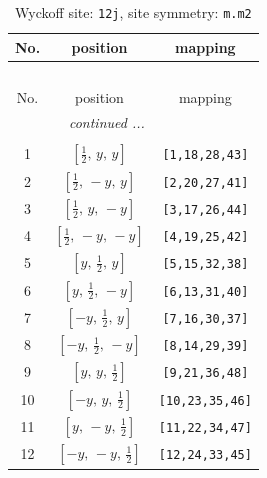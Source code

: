 \documentclass[fleqn,8pt]{jsarticle}
\begin{document}
\begin{longtable}{ccc}
\caption{Wyckoff site: {\tt 12j}, site symmetry: {\tt m.m2}}
 \\
 \hline \hline
No. & position & mapping \\ \hline \endfirsthead

\multicolumn{2}{l}{\tablename\ \thetable{}} \\
 \hline \hline
No. & position & mapping \\ \hline \endhead

 \hline \hline
\multicolumn{2}{r}{\footnotesize\it continued ...} \\ \endfoot

 \hline \hline
\multicolumn{2}{r}{} \\ \endlastfoot

1 & $\left[ \frac{1}{2},\, y,\, y \right]$ & {\tt [1,18,28,43]} \\ \hline
2 & $\left[ \frac{1}{2},\, - y,\, y \right]$ & {\tt [2,20,27,41]} \\ \hline
3 & $\left[ \frac{1}{2},\, y,\, - y \right]$ & {\tt [3,17,26,44]} \\ \hline
4 & $\left[ \frac{1}{2},\, - y,\, - y \right]$ & {\tt [4,19,25,42]} \\ \hline
5 & $\left[ y,\, \frac{1}{2},\, y \right]$ & {\tt [5,15,32,38]} \\ \hline
6 & $\left[ y,\, \frac{1}{2},\, - y \right]$ & {\tt [6,13,31,40]} \\ \hline
7 & $\left[ - y,\, \frac{1}{2},\, y \right]$ & {\tt [7,16,30,37]} \\ \hline
8 & $\left[ - y,\, \frac{1}{2},\, - y \right]$ & {\tt [8,14,29,39]} \\ \hline
9 & $\left[ y,\, y,\, \frac{1}{2} \right]$ & {\tt [9,21,36,48]} \\ \hline
10 & $\left[ - y,\, y,\, \frac{1}{2} \right]$ & {\tt [10,23,35,46]} \\ \hline
11 & $\left[ y,\, - y,\, \frac{1}{2} \right]$ & {\tt [11,22,34,47]} \\ \hline
12 & $\left[ - y,\, - y,\, \frac{1}{2} \right]$ & {\tt [12,24,33,45]} \\
\end{longtable}
\renewcommand{\arraystretch}{1.2}
\end{document}
